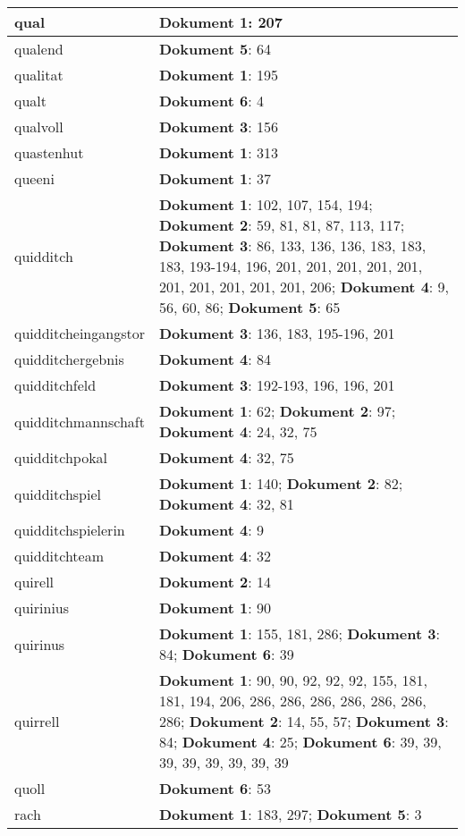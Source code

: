 \documentclass[a5paper]{article}
\begin{document}
\begin{longtable}[l]{|l|p{3in}|}
\hline
qual & \textbf{Dokument 1}: 207 \\
\hline
qualend & \textbf{Dokument 5}: 64 \\
\hline
qualitat & \textbf{Dokument 1}: 195 \\
\hline
qualt & \textbf{Dokument 6}: 4 \\
\hline
qualvoll & \textbf{Dokument 3}: 156 \\
\hline
quastenhut & \textbf{Dokument 1}: 313 \\
\hline
queeni & \textbf{Dokument 1}: 37 \\
\hline
quidditch & \textbf{Dokument 1}: 102, 107, 154, 194; \textbf{Dokument 2}: 59, 81, 81, 87, 113, 117; \textbf{Dokument 3}: 86, 133, 136, 136, 183, 183, 183, 193-194, 196, 201, 201, 201, 201, 201, 201, 201, 201, 201, 201, 206; \textbf{Dokument 4}: 9, 56, 60, 86; \textbf{Dokument 5}: 65 \\
\hline
quidditcheingangstor & \textbf{Dokument 3}: 136, 183, 195-196, 201 \\
\hline
quidditchergebnis & \textbf{Dokument 4}: 84 \\
\hline
quidditchfeld & \textbf{Dokument 3}: 192-193, 196, 196, 201 \\
\hline
quidditchmannschaft & \textbf{Dokument 1}: 62; \textbf{Dokument 2}: 97; \textbf{Dokument 4}: 24, 32, 75 \\
\hline
quidditchpokal & \textbf{Dokument 4}: 32, 75 \\
\hline
quidditchspiel & \textbf{Dokument 1}: 140; \textbf{Dokument 2}: 82; \textbf{Dokument 4}: 32, 81 \\
\hline
quidditchspielerin & \textbf{Dokument 4}: 9 \\
\hline
quidditchteam & \textbf{Dokument 4}: 32 \\
\hline
quirell & \textbf{Dokument 2}: 14 \\
\hline
quirinius & \textbf{Dokument 1}: 90 \\
\hline
quirinus & \textbf{Dokument 1}: 155, 181, 286; \textbf{Dokument 3}: 84; \textbf{Dokument 6}: 39 \\
\hline
quirrell & \textbf{Dokument 1}: 90, 90, 92, 92, 92, 155, 181, 181, 194, 206, 286, 286, 286, 286, 286, 286, 286; \textbf{Dokument 2}: 14, 55, 57; \textbf{Dokument 3}: 84; \textbf{Dokument 4}: 25; \textbf{Dokument 6}: 39, 39, 39, 39, 39, 39, 39, 39 \\
\hline
quoll & \textbf{Dokument 6}: 53 \\
\hline
rach & \textbf{Dokument 1}: 183, 297; \textbf{Dokument 5}: 3 \\

\end{longtable}
\end{document}
